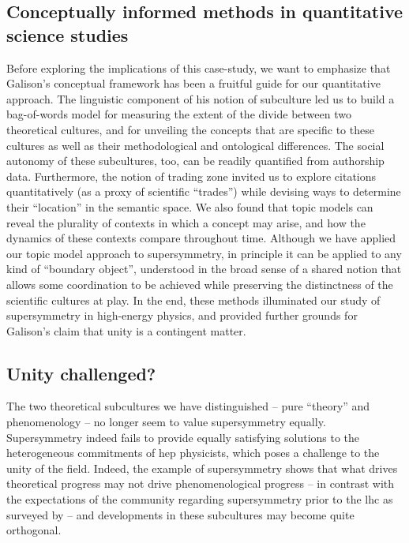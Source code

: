 \documentclass[smallextended]{svjour3}
\begin{document}
\subsection{Conceptually informed methods in quantitative science studies}

Before exploring the implications of this case-study, we want to emphasize that Galison's conceptual framework has been a fruitful guide for our quantitative approach. The linguistic component of his notion of subculture led us to build a bag-of-words model for measuring the extent of the divide between two theoretical cultures, and for unveiling the concepts that are specific to these cultures as well as their methodological and ontological differences. The social autonomy of these subcultures, too, can be readily quantified from authorship data. Furthermore, the notion of trading zone invited us to explore citations quantitatively (as a proxy of scientific ``trades'') while devising ways to determine their ``location'' in the semantic space. We also found that topic models can reveal the plurality of contexts in which a concept may arise, and how the dynamics of these contexts compare throughout time. Although we have applied our topic model approach to supersymmetry, in principle it can be applied to any kind of ``boundary object'', understood in the broad sense of a shared notion that allows some coordination to be achieved while preserving the distinctness of the scientific cultures at play. In the end, these methods illuminated our study of supersymmetry in high-energy physics, and provided further grounds for Galison's claim that unity is a contingent matter.


\subsection{Unity challenged?}

  

The two theoretical subcultures we have distinguished -- pure ``theory'' and phenomenology -- no longer seem to value supersymmetry equally. Supersymmetry indeed fails to provide equally satisfying solutions to the heterogeneous commitments of \gls{hep} physicists, which poses a challenge to the unity of the field. Indeed, the example of supersymmetry shows that what drives theoretical progress may not drive phenomenological progress -- in contrast with the expectations of the community regarding supersymmetry prior to the \gls{lhc} as surveyed by \citealt{Mttig2019,Mttig2020a} -- and developments in these subcultures may become quite orthogonal.
\end{document}
